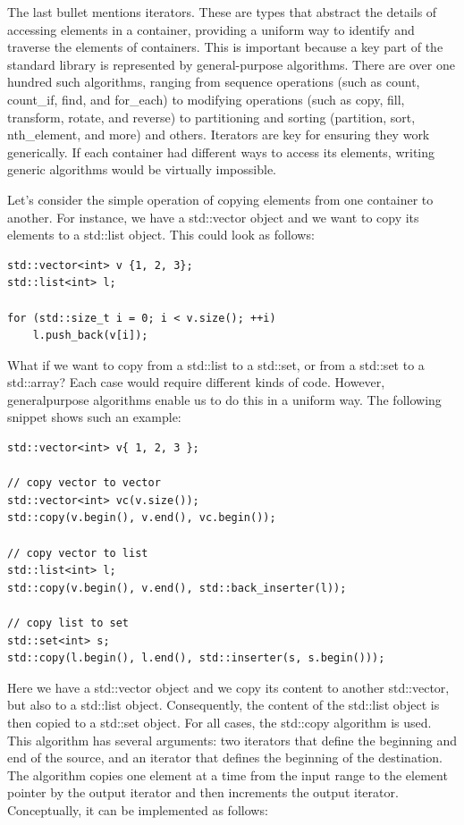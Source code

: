The last bullet mentions iterators. These are types that abstract the details of accessing elements in a container, providing a uniform way to identify and traverse the elements of containers. This is important because a key part of the standard library is represented by general-purpose algorithms. There are over one hundred such algorithms, ranging from sequence operations (such as count, count\_if, find, and for\_each) to modifying operations (such as copy, fill, transform, rotate, and reverse) to partitioning and sorting (partition, sort, nth\_element, and more) and others. Iterators are key for ensuring they work generically. If each container had different ways to access its elements, writing generic algorithms would be virtually impossible.

Let’s consider the simple operation of copying elements from one container to another. For instance, we have a std::vector object and we want to copy its elements to a std::list object. This could look as follows:

\begin{lstlisting}[style=styleCXX]
std::vector<int> v {1, 2, 3};
std::list<int> l;

for (std::size_t i = 0; i < v.size(); ++i)
	l.push_back(v[i]);
\end{lstlisting}

What if we want to copy from a std::list to a std::set, or from a std::set to a std::array? Each case would require different kinds of code. However, generalpurpose algorithms enable us to do this in a uniform way. The following snippet shows such an example:

\begin{lstlisting}[style=styleCXX]
std::vector<int> v{ 1, 2, 3 };

// copy vector to vector
std::vector<int> vc(v.size());
std::copy(v.begin(), v.end(), vc.begin());

// copy vector to list
std::list<int> l;
std::copy(v.begin(), v.end(), std::back_inserter(l));

// copy list to set
std::set<int> s;
std::copy(l.begin(), l.end(), std::inserter(s, s.begin()));
\end{lstlisting}

Here we have a std::vector object and we copy its content to another std::vector, but also to a std::list object. Consequently, the content of the std::list object is then copied to a std::set object. For all cases, the std::copy algorithm is used. This algorithm has several arguments: two iterators that define the beginning and end of the source, and an iterator that defines the beginning of the destination. The algorithm copies one element at a time from the input range to the element pointer by the output iterator and then increments the output iterator. Conceptually, it can be implemented as follows:

